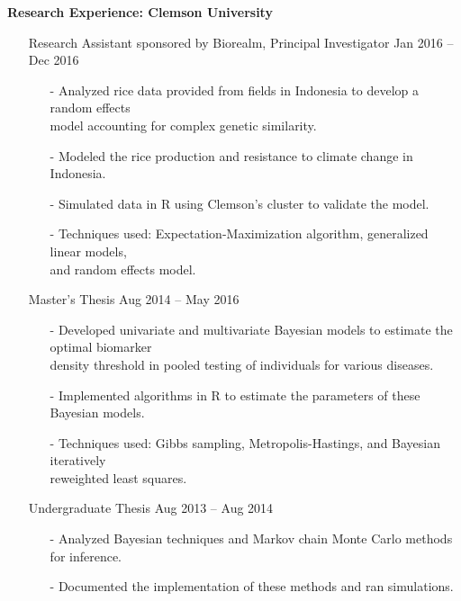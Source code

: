 \documentclass[10pt]{article}
\begin{document}
\noindent
\textbf{Research Experience: Clemson University}
\vspace{-0.25cm}
\begin{itemize}
\item[] Research Assistant sponsored by Biorealm, Principal Investigator \hfill Jan 2016 -- Dec 2016
\vspace{-0.25cm}
\begin{itemize}
\item[-] Analyzed rice data provided from fields in Indonesia to develop a random effects \\ model accounting for complex genetic similarity.
\vspace{-0.1cm}
\item[-] Modeled the rice production and resistance to climate change in Indonesia.
\vspace{-0.1cm}
\item[-] Simulated data in R using Clemson's cluster to validate the model.
\vspace{-0.1cm}
\item[-] Techniques used: Expectation-Maximization algorithm, generalized linear models, \\ and random effects model.
\vspace{-0.25cm}
\end{itemize}
\item[] Master's Thesis \hfill Aug 2014 -- May 2016
\vspace{-0.25cm}
\begin{itemize}
\item[-] Developed univariate and multivariate Bayesian models to estimate the optimal biomarker \\ density threshold in pooled testing of individuals for various diseases.
\vspace{-0.1cm}
\item[-] Implemented algorithms in R to estimate the parameters of these Bayesian models.
\vspace{-0.1cm}
\item[-] Techniques used: Gibbs sampling, Metropolis-Hastings, and Bayesian iteratively \\ reweighted least squares.
\vspace{-0.25cm}
\end{itemize}
\item[] Undergraduate Thesis \hfill Aug 2013 -- Aug 2014
\vspace{-0.25cm}
\begin{itemize}
\item[-] Analyzed Bayesian techniques and Markov chain Monte Carlo methods for inference.
\vspace{-0.1cm}
\item[-] Documented the implementation of these methods and ran simulations.
\end{itemize}
\end{itemize}
\end{document}
